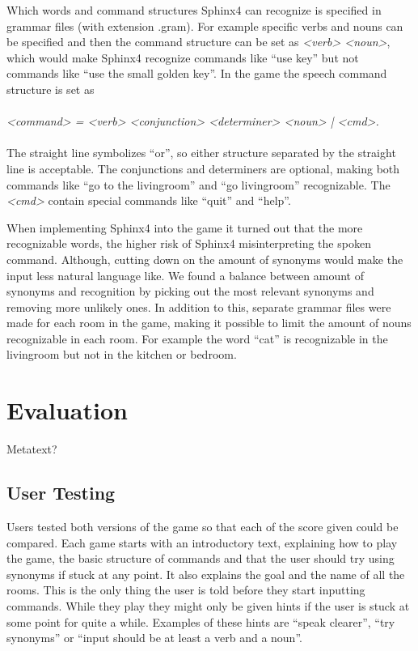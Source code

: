 Which words and command structures Sphinx4 can recognize is specified in grammar files (with extension .gram). For example specific verbs and nouns can be specified and then the command structure can be set as \textit{<verb> <noun>}, which would make Sphinx4 recognize commands like ``use key'' but not commands like ``use the small golden key''. In the game the speech command structure is set as
\\
\\
\textit{<command> = <verb> <conjunction> <determiner> <noun> | <cmd>.}
\\
\\
The straight line symbolizes ``or'', so either structure separated by the straight line is acceptable. The conjunctions and determiners are optional, making both commands like ``go to the livingroom'' and ``go livingroom'' recognizable. The \textit{<cmd>} contain special commands like ``quit'' and ``help''.

When implementing Sphinx4 into the game it turned out that the more recognizable words, the higher risk of Sphinx4 misinterpreting the spoken command. Although, cutting down on the amount of synonyms would make the input less natural language like. We found a balance between amount of synonyms and recognition by picking out the most relevant synonyms and removing more unlikely ones. In addition to this, separate grammar files were made for each room in the game, making it possible to limit the amount of nouns recognizable in each room. For example the word ``cat'' is recognizable in the livingroom but not in the kitchen or bedroom.

\section{Evaluation}
Metatext?

\subsection{User Testing}
Users tested both versions of the game so that each of the score given could be compared. Each game starts with an introductory text, explaining how to play the game, the basic structure of commands and that the user should try using synonyms if stuck at any point. It also explains the goal and the name of all the rooms. This is the only thing the user is told before they start inputting commands. While they play they might only be given hints if the user is stuck at some point for quite a while. Examples of these hints are ``speak clearer'', ``try synonyms'' or ``input should be at least a verb and a noun''.

